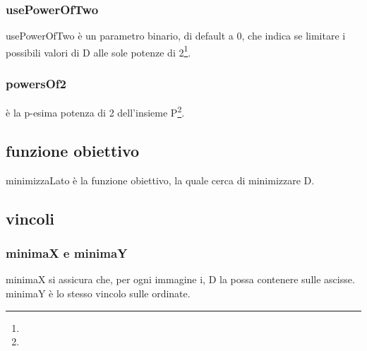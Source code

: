 \subsubsection{usePowerOfTwo}
usePowerOfTwo è un parametro binario, di default a 0, che indica se limitare i possibili valori di D alle sole potenze di 2\footnote{\footTwoPowers}.


\subsubsection{powersOf2}
\powersOfTp{} è la p-esima potenza di 2 dell'insieme P\footnote{\footFreedom}.







\newpage






\subsection{funzione obiettivo}
\iffalse
\begin{math}
 minimize D
\end{math}
\fi

minimizzaLato è la funzione obiettivo, la quale cerca di minimizzare D.




\subsection{vincoli}

\subsubsection{minimaX e minimaY}
minimaX si assicura che, per ogni immagine i, D la possa contenere sulle ascisse. \\
minimaY è lo stesso vincolo sulle ordinate.




